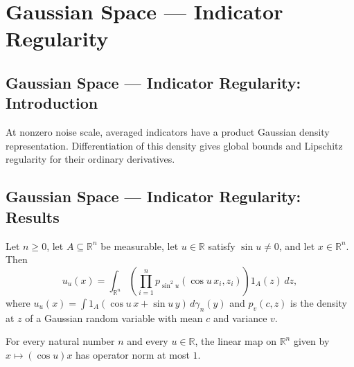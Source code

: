 \section{Gaussian Space --- Indicator Regularity}
\subsection*{Gaussian Space --- Indicator Regularity: Introduction}
At nonzero noise scale, averaged indicators have a product Gaussian density representation. Differentiation of this density gives global bounds and Lipschitz regularity for their ordinary derivatives.

\subsection*{Gaussian Space --- Indicator Regularity: Results}

\begin{lemma}
\leanok
{}
Let $n\ge0$, let $A\subseteq\mathbb R^n$ be measurable, let $u\in\mathbb R$ satisfy
$\sin u\ne0$, and let $x\in\mathbb R^n$. Then
\[
u_u(x)=\int_{\mathbb R^n}\left(\prod_{i=1}^n p_{\sin^2 u}(\cos
u\,x_i,z_i)\right)1_A(z)\,dz,
\]
where $u_u(x)=\int 1_A(\cos u\,x+\sin u\,y)\,d\gamma_n(y)$ and $p_v(c,z)$ is the density
at $z$ of a Gaussian random variable with mean $c$ and variance $v$.
\end{lemma}

\begin{lemma}
\leanok
{}
For every natural number $n$ and every $u\in\mathbb R$, the linear map on $\mathbb R^n$
given by $x\mapsto(\cos u)x$ has operator norm at most $1$.
\end{lemma}

